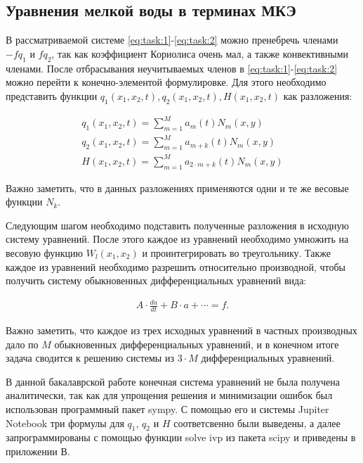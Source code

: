 \documentclass[14pt]{extreport}
\begin{document}
\subsection{Уравнения мелкой воды в терминах МКЭ}

В рассматриваемой системе \eqref{eq:task:1}-\eqref{eq:task:2} можно пренебречь членами $-fq_{1}$ и $fq_2$, так как коэффициент Кориолиса очень мал, а также конвективными членами. После отбрасывания неучитываемых членов в \eqref{eq:task:1}-\eqref{eq:task:2} можно перейти к конечно-элементой формулировке. Для этого необходимо представить функции $q_1(x_1, x_2,t) , q_2(x_1, x_2,t), H(x_1, x_2,t)$ как разложения:

\begin{eqnarray}\label{eq:fem:approx}
q_1(x_1, x_2, t) = \sum\limits_{m=1}^{M} a_m(t)N_m(x, y) \\
q_2(x_1, x_2, t) = \sum\limits_{m=1}^{M} a_{m+k}(t)N_m(x, y) \\
H(x_1, x_2, t) = \sum\limits_{m=1}^{M} a_{2\cdot m+k}(t)N_m(x, y)
\end{eqnarray}

Важно заметить, что в данных разложениях применяются одни и те же весовые функции $N_k$.

Следующим шагом необходимо подставить полученные разложения в исходную систему уравнений. После этого каждое из уравнений необходимо умножить на весовую функцию $W_l(x_1, x_2)$ и проинтегрировать во треугольнику. Также каждое из уравнений необходимо разрешить относительно производной, чтобы получить систему обыкновенных дифференциальных уравнений\cite{bib:calc:gurevich:2004} вида:

\begin{eqnarray}
A \cdot \frac{da}{dt} + B \cdot a + \cdots = f.
\end{eqnarray}

Важно заметить, что каждое из трех исходных уравнений в частных производных дало по $M$ обыкновенных дифференциальных уравнений, и в конечном итоге задача сводится к решению системы из $3\cdot M$ дифференциальных уравнений.

В данной бакалаврской работе конечная система уравнений не была получена аналитически, так как для упрощения решения и минимизации ошибок был использован программный пакет sympy\cite{bib:python:mastering:2015}. С помощью его и системы Jupiter Notebook три формулы для $q_1$, $q_2$ и $H$ соответсвенно  были выведены, а далее запрограммированы с помощью функции solve ivp из пакета scipy и приведены в приложении В.
\end{document}
